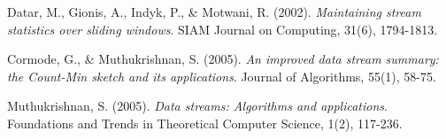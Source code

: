 \documentclass{article}
\begin{document}
\begin{thebibliography}{9}

Datar, M., Gionis, A., Indyk, P., \& Motwani, R. (2002). \textit{Maintaining stream statistics over sliding windows}. SIAM Journal on Computing, 31(6), 1794-1813.

Cormode, G., \& Muthukrishnan, S. (2005). \textit{An improved data stream summary: the Count-Min sketch and its applications}. Journal of Algorithms, 55(1), 58-75.

Muthukrishnan, S. (2005). \textit{Data streams: Algorithms and applications}. Foundations and Trends in Theoretical Computer Science, 1(2), 117-236.

\end{thebibliography}
\end{document}

